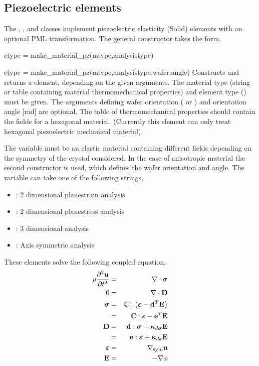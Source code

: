\subsection{Piezoelectric elements}
The , , 
and 
classes implement piezoelectric elasticity (Solid) elements with an 
optional PML transformation. 
The general constructor takes the form,
\begin{codelist}
  \item[etype = make\_material\_pz(mtype,analysistype)]
  \item[etype = make\_material\_pz(mtype,analysistype,wafer,angle)]
    Constructs and returns a  element, depending on the
    given arguments. The material type  (string or table containing
    material thermomechanical properties) and element type
    () must be given. 
    The arguments defining wafer orientation ( or
    ) and orientation angle  [rad] are optional.
    The table of thermomechanical properties  should contain the 
    fields  for a 
    hexagonal material.
    (Currently this element can only treat hexagonal piezoelectric mechanical
     material).
\end{codelist}
The variable  must be an elastic material containing
different fields depending on the symmetry of the crystal considered.
In the case of anisotropic material the second constructor is used,
which defines the wafer orientation and angle.
The variable  can take one of the 
following strings,
\begin{itemize}
\item {}: 2 dimensional planestrain analysis
\item {}: 2 dimensional planestress analysis
\item {}: 3 dimensional analysis
\item {}: Axis symmetric analysis
\end{itemize}
These elements solve the following 
coupled equation,
\begin{eqnarray}
\rho \frac{\partial^2 \mathbf{u}}{\partial t^2}
&=& \mathbf{\nabla}\cdot\boldsymbol{\sigma} \\
0
&=& \mathbf{\nabla}\cdot\mathbf{D} \\
\boldsymbol{\sigma} &=& \mathbb{C}:\left(\boldsymbol{\varepsilon} - \mathbf{d}^T\mathbf{E} \right)\\
      &=& \mathbb{C}:\boldsymbol{\varepsilon} - \mathbf{e}^T\mathbf{E} \\
\mathbf{D}  &=& \mathbf{d}:\boldsymbol{\sigma} + \boldsymbol{\kappa}_{d\boldsymbol{\sigma}}\mathbf{E} \\
      &=& \mathbf{e}:\boldsymbol{\varepsilon} + \boldsymbol{\kappa}_{d\boldsymbol{\varepsilon}}\mathbf{E} \\
\boldsymbol{\varepsilon} &=& \mathbf{\nabla}_\text{sym}\mathbf{u} \\
\mathbf{E}  &=&-\mathbf{\nabla}\phi
\end{eqnarray}
